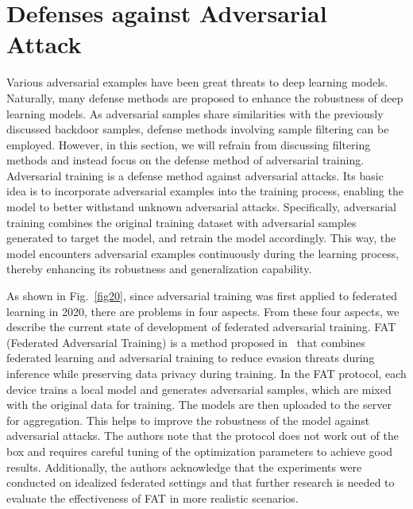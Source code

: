 \documentclass[pdflatex,sn-mathphys-num]{sn-jnl}%
\theoremstyle{thmstyleone}%
\theoremstyle{thmstyletwo}%
\theoremstyle{thmstylethree}%
\begin{document}
\section{Defenses against Adversarial Attack}
\label{Defenses against Adversarial Attack}
Various adversarial examples have been great threats to
deep learning models. Naturally, many defense methods
are proposed to enhance the robustness of deep learning
models. As adversarial samples share similarities with the
previously discussed backdoor samples, defense methods
involving sample filtering can be employed. However, in
this section, we will refrain from discussing filtering methods and instead focus on the defense method of adversarial
training. Adversarial training is a defense method against
adversarial attacks. Its basic idea is to incorporate
adversarial examples into the training process, enabling the
model to better withstand unknown adversarial attacks.
Specifically, adversarial training combines the original
training dataset with adversarial samples generated to
target the model, and retrain the model accordingly. This
way, the model encounters adversarial examples
continuously during the learning process, thereby enhancing
its robustness and generalization capability.

As shown in Fig.~\ref{fig20}, since adversarial training was first applied to
federated learning in 2020, there are problems in four
aspects. From these four aspects, we describe the current
state of development of federated adversarial training.
FAT (Federated Adversarial Training) is a method
proposed in~\cite{zizzo2020fat} that combines federated learning and
adversarial training to reduce evasion threats during
inference while preserving data privacy during training.
In the FAT protocol, each device trains a local model and
generates adversarial samples, which are mixed with the
original data for training. The models are then uploaded
to the server for aggregation. This helps to improve the
robustness of the model against adversarial attacks. The
authors note that the protocol does not work out of
the box and requires careful tuning of the optimization
parameters to achieve good results. Additionally, the
authors acknowledge that the experiments were conducted
on idealized federated settings and that further research
is needed to evaluate the effectiveness of FAT in more
realistic scenarios.
\end{document}
